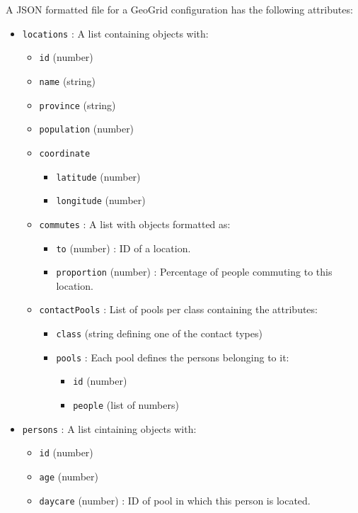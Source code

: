 A JSON formatted file for a GeoGrid configuration has the following attributes:
\begin{itemize}
	\item \texttt{locations} 
		: A list containing objects with:
		\begin{itemize}
			\item \texttt{id} (number)
			\item \texttt{name} (string)
			\item \texttt{province} (string)
			\item \texttt{population} (number)
			\item \texttt{coordinate} 
				\begin{itemize}
					\item \texttt{latitude} (number)
					\item \texttt{longitude} (number)
				\end{itemize}
			\item \texttt{commutes} 
				: A list with objects formatted as:
				\begin{itemize}
					\item \texttt{to} (number) : ID of a location.
					\item \texttt{proportion} (number) : Percentage of people commuting to this location.
				\end{itemize}
			\item \texttt{contactPools} 
				: List of pools per class containing the attributes:
				\begin{itemize}
					\item \texttt{class} (string defining one of the contact types)
					\item \texttt{pools} 
						: Each pool defines the persons belonging to it:
						\begin{itemize}
							\item \texttt{id} (number)
							\item \texttt{people} (list of numbers)
						\end{itemize}
				\end{itemize}
		\end{itemize}
	\item \texttt{persons}
		: A list cintaining objects with:
		\begin{itemize}
			\item \texttt{id} (number)
			\item \texttt{age} (number)
			\item \texttt{daycare} (number) : ID of pool in which this person is located.

\end{itemize}
\end{itemize}
